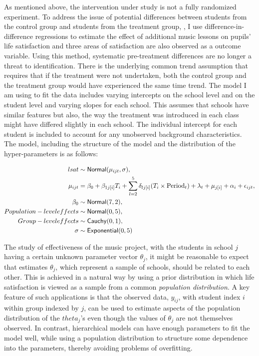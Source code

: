 \documentclass[a4, 12pt]{article}
\begin{document}
\label{subsec:model}
As mentioned above, the intervention under study is not a fully randomized experiment. To address the issue of potential differences between students from the control group and students from the treatment group, , I use difference-in-difference regressions to estimate the effect of additional music lessons on pupils' life satisfaction and three areas of satisfaction are also observed as a outcome variable. Using this method, systematic pre-treatment differences are no longer a threat to identification. There is the underlying common trend assumption that requires that if the treatment were not undertaken, both the control group and the treatment group would have experienced the same time trend.
The model I am using to fit the data includes varying intercepts on the school level and on the student level and varying slopes for each school. This assumes that schools have similar features but also, the way the treatment was introduced in each class might have differed slightly in each school. The individual intercept for each student is included to account for any unobserved background characteristics. The model, including the structure of the model and the distribution of the hyper-parameters is as follows:

\begin{align*}
lsat & \sim {\sf Normal} (\mu_{ijt}, \sigma), \\
\mu_{ijt} & = \beta_0 + \beta_{1j[i]} T_i + \sum\limits_{l=2}^5\delta_{lj[i]} (T_{i} \times \text{Period}_{t}) + \lambda_t + \mu_{j[i]} + \alpha_{i} + \epsilon_{ijt}, \\
\beta_0 & \sim  {\sf Normal}(7,2), \\
Population-level effects & \sim {\sf Normal}(0,5), \\
Group-level effects & \sim {\sf Cauchy}(0,1), \\
\sigma & \sim {\sf Exponential}(0,5)
\end{align*}

The study of effectiveness of the music project, with the students in school \(j\) having a certain unknown parameter vector \(\theta_j\), it might be reasonable to expect that estimates \(\theta_j\), which represent a sample of schools, should be related to each other. This is achieved in a natural way by using a prior distribution in which life satisfaction is viewed as a sample from a common \emph{population distribution}. A key feature of such applications is that the observed data, \(y_{ij}\), with student index \(i\) within group indexed by \(j\), can be used to estimate aspects of the population distribution of the \(theta_j\)'s even though the values of \(\theta_j\) are not themselves observed. In contrast, hierarchical models can have enough parameters to fit the model well, while using a population distribution to structure some dependence into the parameters, thereby avoiding problems of overfitting.
\end{document}
